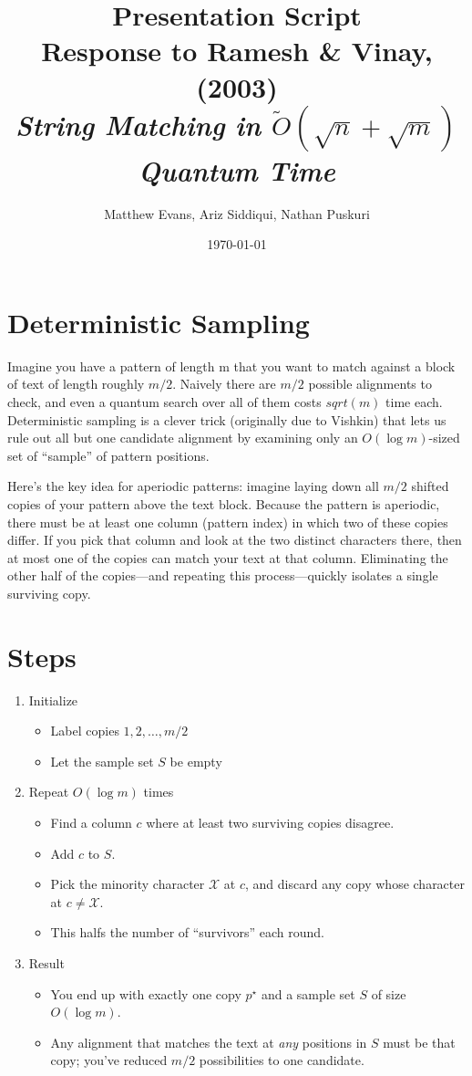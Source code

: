 \documentclass[11pt]{article}
\title{Presentation Script \\ 
\Large{Response to Ramesh \& Vinay, (2003)\\ 
\small{\textit{String Matching in \(\tilde{O}(\sqrt{n} + \sqrt{m})\) Quantum Time}} }}
\author{%
\normalsize{Matthew Evans, Ariz Siddiqui, Nathan Puskuri}
}
\date{\today}
\begin{document}
\maketitle

\section*{Deterministic Sampling}
Imagine you have a pattern of length m that you want to match against a block of text of length roughly \(m/2\). Naively there are \(m/2\) possible alignments to check, and even a quantum search over all of them costs \(sqrt(m)\) time each. Deterministic sampling is a clever trick (originally due to Vishkin) that lets us rule out all but one candidate alignment by examining only an \(O(\log m)\)-sized set of ``sample'' of pattern positions.

Here's the key idea for aperiodic patterns: imagine laying down all \(m/2\) shifted copies of your pattern above the text block. Because the pattern is aperiodic, there must be at least one column (pattern index) in which two of these copies differ. If you pick that column and look at the two distinct characters there, then at most one of the copies can match your text at that column. Eliminating the other half of the copies—and repeating this process—quickly isolates a single surviving copy.

\section*{Steps}
\begin{enumerate}
  \item Initialize \begin{itemize}
          \item Label copies \(1, 2, \dots, m/2\)
          \item Let the sample set \(S\) be empty
        \end{itemize}
  \item Repeat \(O(\log m)\) times \begin{itemize}
          \item Find a column \(c\) where at least two surviving copies disagree.
          \item Add \(c\) to \(S\).
          \item Pick the minority character \(\mathcal{X}\) at \(c\), and discard any copy whose character at \(c \neq \mathcal{X}\).
          \item This halfs the number of ``survivors'' each round.
        \end{itemize}
  \item Result \begin{itemize}
          \item You end up with exactly one copy \(p^\star\) and a sample set \(S\) of size \(O(\log m)\).
          \item Any alignment that matches the text at \textit{any} positions in \(S\) must be that copy; you've reduced \(m/2\) possibilities to one candidate.
        \end{itemize}
\end{enumerate}
\end{document}
